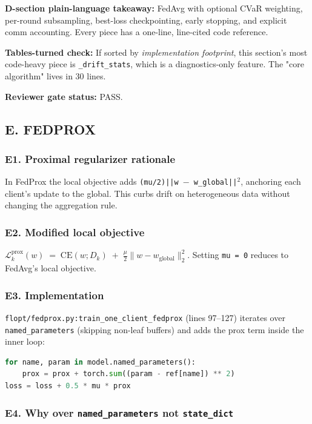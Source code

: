 \documentclass{article}
\begin{document}
\textbf{D-section plain-language takeaway:} FedAvg with optional CVaR weighting, per-round subsampling, best-loss checkpointing, early stopping, and explicit comm accounting. Every piece has a one-line, line-cited code reference.


\textbf{Tables-turned check:} If sorted by \emph{implementation footprint}, this section's most code-heavy piece is \texttt{\_drift\_stats}, which is a diagnostics-only feature. The "core algorithm" lives in 30 lines.


\textbf{Reviewer gate status:} PASS.


\subsection{E. FEDPROX}


\subsubsection{E1. Proximal regularizer rationale}


In FedProx the local objective adds \texttt{(mu/2)||w \ensuremath{-} w\_global||\ensuremath{^{2}}}, anchoring each client's update to the global. This curbs drift on heterogeneous data without changing the aggregation rule.


\subsubsection{E2. Modified local objective}


\(\mathcal{L}_k^{\text{prox}}(w) \;=\; \text{CE}(w; D_k) \;+\; \frac{\mu}{2} \|w - w_{\text{global}}\|_2^2\). Setting \texttt{mu = 0} reduces to FedAvg's local objective.


\subsubsection{E3. Implementation}


\texttt{flopt/fedprox.py:train\_one\_client\_fedprox} (lines 97--127) iterates over \texttt{named\_parameters} (skipping non-leaf buffers) and adds the prox term inside the inner loop:


\begin{lstlisting}[language=Python]
for name, param in model.named_parameters():
    prox = prox + torch.sum((param - ref[name]) ** 2)
loss = loss + 0.5 * mu * prox
\end{lstlisting}


\subsubsection{E4. Why over \texttt{named\_parameters} not \texttt{state\_dict}}
\end{document}
